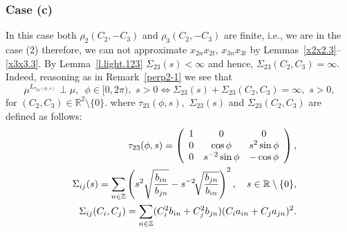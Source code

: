 \documentclass[preprint,12pt]{elsarticle}
\numberwithin{equation}{section}
\begin{document}
\subsubsection{Case (c)}
%
In this case  both $\rho_2(C_2,-C_3)$ and $\rho_3(C_2,-C_3)$ are finite, i.e.,
we are in the case (2)
therefore, we can not approximate $x_{2n}x_{2t},\,x_{3n}x_{3t}$ by Lemmas~\ref{x2x2.3}--\ref{x3x3.3}.  By Lemma~\ref{l.light.123}  $\Sigma_{23}(s)<\infty$ 
and hence, 
$\Sigma_{23}(C_2,C_3)=\infty$.
Indeed, reasoning as in Remark~\ref{perp2-1} 
we see that
\begin{equation}
 \label{(c).m=3}
\mu^{L_{\tau_{23}(\phi,s)}}\perp\mu,\,\,\,\phi\in[0,2\pi),\,\,s>0\Leftrightarrow
\Sigma_{23}(s)+\Sigma_{23}(C_2,C_3)\!=\!\infty,\,\,s>0,
\end{equation}
for $(C_2,C_3)\in{\mathbb R}^2\setminus\{0\}$.
%
where $\tau_{23}(\phi,s),\,\,\Sigma_{23}(s)$ and $\Sigma_{23}(C_2,C_3)$
are defined as follows:
%
\begin{eqnarray}
\label{tau(ij)}
&&
\tau_{23}(\phi,s)= \left(
\begin{array}{ccc}
1&0&0\\
0&\cos\phi&s^2\sin\phi\\
0&s^{-2}\sin\phi&-\cos\phi
\end{array}
\right),\\
\label{sigma-ij(s)}
&&
\Sigma_{ij}(s)
=\sum_{n\in {\mathbb Z}}
\left(s^2\sqrt{\frac{b_{in}}{b_{jn}}}-s^{-2}\!\sqrt{\frac{b_{jn}}{b_{in}}}\right)^2,\quad s\in \mathbb R\setminus\{0\}, \\
\label{sigma_{ij}(C_i,C_j)}
&&
\Sigma_{ij}(C_i,C_j)
=\sum_{n\in {\mathbb Z}}(C^2_ib_{in}+C^2_jb_{jn})(C_ia_{in}+C_ja_{jn})^2.
\end{eqnarray}
\end{document}
